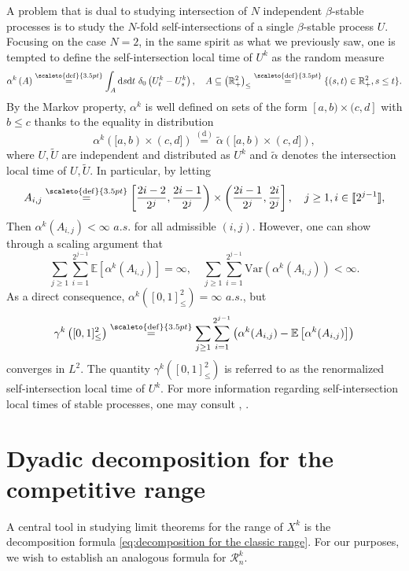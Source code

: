 \documentclass[12pt]{article}
\newcommand{\RR}{\mathbb R}
\newcommand{\EE}{\mathbb E}
\newcommand{\1}{\mathds{1}}
\renewcommand{\d}{\mathrm d}
\newcommand{\eqdef}{\stackrel{\scaleto{\mathrm{def}}{3.5pt}}{=}}
\numberwithin{equation}{section}
\begin{document}
A problem that is dual to studying intersection of $N$ independent $\beta$-stable processes is to study the $N$-fold self-intersections of a single $\beta$-stable process $U$. Focusing on the case $N=2$, in the same spirit as what we previously saw, one is tempted to define the self-intersection local time of $U^k$ as the random measure
\begin{equation*}
    \alpha^k\left(A\right)\eqdef\int_A\d s \d t\ \delta_0\left(U_t^k-U_s^k\right),\quad A\subseteq\left(\RR_+^2\right)_\le\eqdef\{(s,t)\in\RR_+^2, s\le t\}.
\end{equation*}
By the Markov property, $\alpha^k$ is well defined on sets of the form $[a,b)\times(c,d]$ with $b\le c$ thanks to the equality in distribution
\begin{equation*}
    \alpha^k([a,b)\times(c,d])\overset{\mathrm{(d)}}=\widetilde \alpha([a,b)\times(c,d]),
\end{equation*}
where $U,\widetilde U$ are independent and distributed as $U^k$ and $\widetilde\alpha$ denotes the intersection local time of $U,\widetilde U$. In particular, by letting 
\begin{equation*}
    A_{i,j}\eqdef\left[\frac{2i-2}{2^j},\frac{2i-1}{2^j}\right)\times\left(\frac{2i-1}{2^j},\frac{2i}{2^j}\right],\quad j\ge1,i\in[\![2^{j-1}]\!],
\end{equation*}
Then $\alpha^k(A_{i,j})<\infty$ $a.s.$ for all admissible $(i,j)$. However, one can show through a scaling argument that
\begin{equation*}
    \sum_{j\ge1}\sum_{i=1}^{2^{j-1}}\EE\left[\alpha^k(A_{i,j})\right]=\infty,\quad  \sum_{j\ge1}\sum_{i=1}^{2^{j-1}}\mathrm{Var}\left(\alpha^k\left(A_{i,j}\right)\right)<\infty.
\end{equation*}
As a direct consequence, $\alpha^k\left([0,1]_\le^2\right)=\infty$ $a.s.$, but
\begin{equation*}
    \gamma^k\left([0,1]_\le^2\right)\eqdef\sum_{j\ge1}\sum_{i=1}^{2^{j-1}}\left(\alpha^k(A_{i,j})-\EE\left[\alpha^k(A_{i,j})\right]\right)
\end{equation*}
converges in $L^2$. The quantity $\gamma^k\left([0,1]_\le^2\right)$ is referred to as the renormalized self-intersection local time of $U^k$. For more information regarding self-intersection local times of stable processes, one may consult \cite{BassChenRosenLDSILT}, \cite{ChenRosen2005}.

\section{Dyadic decomposition for the competitive range}
A central tool in studying limit theorems for the range of $X^k$ is the decomposition formula \eqref{eq:decomposition for the classic range}. For our purposes, we wish to establish an analogous formula for $\mathcal R_n^k$.
\end{document}
